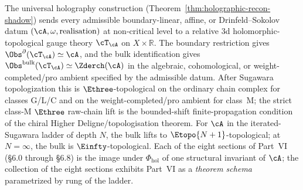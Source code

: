 \begin{theorem}
\label{thm:part-vi-holography-is-a-theorem}
The universal holography construction
(Theorem~\ref{thm:holographic-recon-shadow}) sends every admissible
boundary-linear, affine, or Drinfeld--Sokolov datum
$(\cA,\omega,\mathrm{realisation})$ at non-critical level to a
relative 3d holomorphic-topological gauge theory $\cT_\cA$ on
$X \times \mathbb{R}$. The boundary restriction gives
$\Obs^\partial(\cT_\cA) \simeq \cA$, and the bulk identification gives
$\Obs^{\mathrm{bulk}}(\cT_\cA) \simeq \Zderch(\cA)$ in the algebraic,
cohomological, or weight-completed/pro ambient specified by the
admissible datum. After Sugawara topologization this is
$\Ethree$-topological on the ordinary chain complex for classes G/L/C
and on the weight-completed/pro ambient for class~M; the strict class-M
$\Ethree$ raw-chain lift is the bounded-shift finite-propagation
condition of the chiral Higher Deligne/topologisation theorem. For
$\cA$ in the
iterated-Sugawara ladder of depth $N$, the bulk lifts to
$\Etopo{N+1}$-topological; at $N = \infty$, the bulk is
$\Einfty$-topological. Each of the eight sections of Part~VI
\textup{(}\S6.0 through \S6.8\textup{)} is the image under
$\Phi_{\mathrm{hol}}$ of one structural invariant of $\cA$; the
collection of the eight sections exhibits Part~VI as a \emph{theorem
schema} parametrized by rung of the ladder.
\end{theorem}
